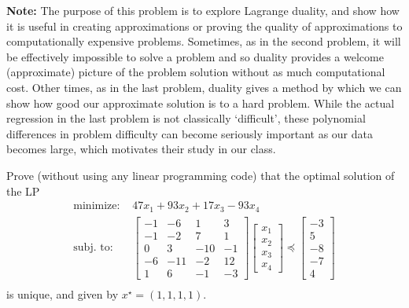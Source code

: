 \documentclass[12pt,letterpaper,cm]{hmcpset}
\newcommand\m[1]{\begin{bmatrix} #1 \end{bmatrix}}
\begin{document}
\textbf{Note:} The purpose of this problem is to explore Lagrange duality, and show how it is useful in creating approximations or proving the quality of approximations to computationally expensive problems. Sometimes, as in the second problem, it will be effectively impossible to solve a problem and so duality provides a welcome (approximate) picture of the problem solution without as much computational cost. Other times, as in the last problem, duality gives a method by which we can show how good our approximate solution is to a hard problem. While the actual regression in the last problem is not classically `difficult', these polynomial differences in problem difficulty can become seriously important as our data becomes large, which motivates their study in our class.

\begin{problem}[Boyd 5.28]
    Prove (without using any linear programming code) that the optimal solution of the LP
    \begin{align*}
        \text{minimize: } & 47 x_1 + 93 x_2 + 17x_3 - 93 x_4\\
        \text{subj. to: } & \m{-1&-6&1&3\\-1&-2&7&1\\0&3&-10&-1\\-6&-11&-2&12\\1&6&-1&-3}\m{x_1\\x_2\\x_3\\x_4}\preceq \m{-3\\5\\-8\\-7\\4}\\
    \end{align*}
    is unique, and given by $x^\star = (1,1,1,1)$.
\end{problem}

\begin{solution}
    \vfill
\end{solution}
\end{document}
